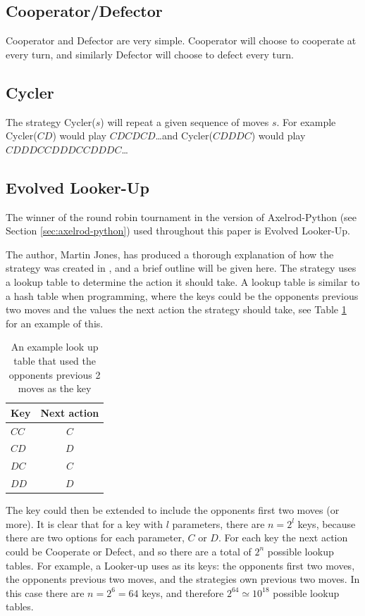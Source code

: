 \subsection{Cooperator/Defector}\label{ssec:strat_coop_defect}
Cooperator and Defector are very simple.
Cooperator will choose to cooperate at every turn, and similarly Defector will choose to defect every turn.

\subsection{Cycler}\label{ssec:strat_cycler}
The strategy Cycler($s$) will repeat a given sequence of moves $s$.
For example Cycler($CD$) would play $CDCDCD$\dots and Cycler($CDDDC$) would play $CDDDCCDDDCCDDDC$\dots

\subsection{Evolved Looker-Up}\label{ssec:strat_evolved_lu}
The winner of the round robin tournament in the version of Axelrod-Python (see Section \ref{sec:axelrod-python}) used throughout this paper is Evolved Looker-Up.

The author, Martin Jones, has produced a thorough explanation of how the strategy was created in \cite{MoJones}, and a brief outline will be given here.
The strategy uses a lookup table to determine the action it should take.
A lookup table is similar to a hash table when programming, where the keys could be the opponents previous two moves and the values the next action the strategy should take, see Table \ref{tab:lookup_table} for an example of this.

\begin{table}[htbp!]
    \centering
    \begin{tabular}{l c}
        \toprule
        Key & Next action \\
        \midrule
        $CC$ & $C$ \\
        $CD$ & $D$ \\
        $DC$ & $C$ \\
        $DD$ & $D$ \\
        \bottomrule
    \end{tabular}
    \caption{An example look up table that used the opponents previous 2 moves as the key}
    \label{tab:lookup_table}
\end{table}

The key could then be extended to include the opponents first two moves (or more).
It is clear that for a key with $l$ parameters, there are $n = 2^l$ keys, because there are two options for each parameter, $C$ or $D$.
For each key the next action could be Cooperate or Defect, and so there are a total of $2^n$ possible lookup tables.
For example, a Looker-up uses as its keys: the opponents first two moves, the opponents previous two moves, and the strategies own previous two moves.
In this case there are $n = 2^6 = 64$ keys, and therefore $2^{64} \simeq 10^{18}$ possible lookup tables.

